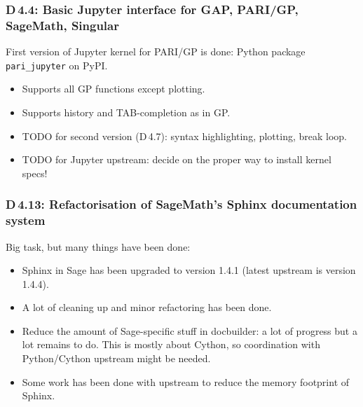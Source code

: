 \documentclass{beamer}
\begin{document}
\begin{frame}
\frametitle{D\,4.4: Basic Jupyter interface for GAP, PARI/GP, SageMath, Singular}

First version of Jupyter kernel for PARI/GP is done: Python package \texttt{pari\_jupyter} on PyPI.

\begin{itemize}
\item Supports all GP functions except plotting.

\item Supports history and TAB-completion as in GP.

\item TODO for second version (D\,4.7): syntax highlighting, plotting, break loop.

\item TODO for Jupyter upstream: decide on the proper way to install kernel specs!
\end{itemize}
\end{frame}

\begin{frame}
\frametitle{D\,4.13: Refactorisation of SageMath's Sphinx documentation system}

Big task, but many things have been done:

\begin{itemize}
\item Sphinx in Sage has been upgraded to version 1.4.1 (latest upstream is version 1.4.4).

\item A lot of cleaning up and minor refactoring has been done.

\item Reduce the amount of Sage-specific stuff in docbuilder: a lot of progress
but a lot remains to do.
This is mostly about Cython, so coordination with Python/Cython upstream might be needed.

\item Some work has been done with upstream to reduce the memory footprint of Sphinx.
\end{itemize}
\end{frame}
\end{document}
